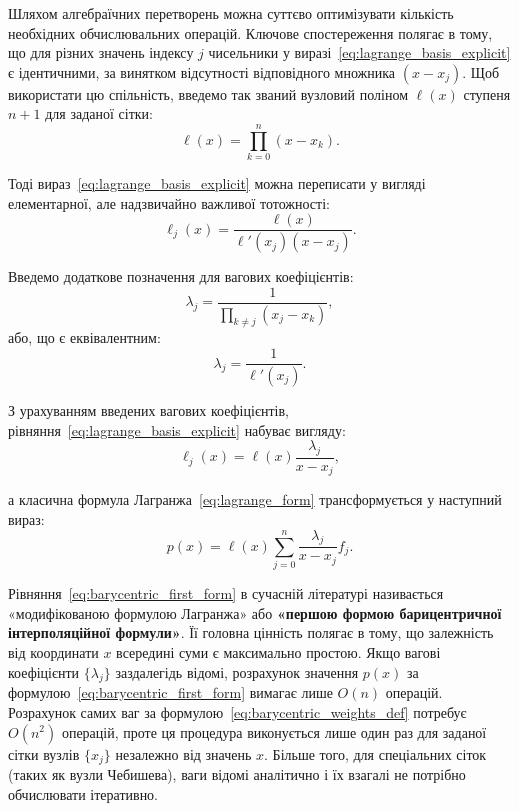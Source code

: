 Шляхом алгебраїчних перетворень можна суттєво оптимізувати кількість необхідних обчислювальних операцій. Ключове спостереження полягає в тому, що для різних значень індексу $j$ чисельники у виразі~\eqref{eq:lagrange_basis_explicit} є ідентичними, за винятком відсутності відповідного множника $(x - x_j)$. Щоб використати цю спільність, введемо так званий вузловий поліном $\ell(x)$ ступеня $n+1$ для заданої сітки:
\begin{equation}\label{eq:nodal_polynomial}
	\ell(x) = \prod_{k=0}^{n} (x - x_k).
\end{equation}

Тоді вираз~\eqref{eq:lagrange_basis_explicit} можна переписати у вигляді елементарної, але надзвичайно важливої тотожності:
\begin{equation}\label{eq:lagrange_identity}
	\ell_j(x) = \frac{\ell(x)}{\ell'(x_j)(x - x_j)}.
\end{equation}

Введемо додаткове позначення для вагових коефіцієнтів:
\begin{equation}\label{eq:barycentric_weights_def}
	\lambda_j = \frac{1}{\prod_{k \neq j} (x_j - x_k)},
\end{equation}
або, що є еквівалентним:
\begin{equation}\label{eq:barycentric_weights_derivative}
	\lambda_j = \frac{1}{\ell'(x_j)}.
\end{equation}

З урахуванням введених вагових коефіцієнтів, рівняння~\eqref{eq:lagrange_basis_explicit} набуває вигляду:
\begin{equation}\label{eq:lagrange_basis_barycentric}
	\ell_j(x) = \ell(x) \frac{\lambda_j}{x - x_j},
\end{equation}

а класична формула Лагранжа~\eqref{eq:lagrange_form} трансформується у наступний вираз:
\begin{equation}\label{eq:barycentric_first_form}
	p(x) = \ell(x) \sum_{j=0}^{n} \frac{\lambda_j}{x - x_j} f_j.
\end{equation}

Рівняння~\eqref{eq:barycentric_first_form} в сучасній літературі називається «модифікованою формулою Лагранжа» або \textbf{«першою формою барицентричної інтерполяційної формули»}. Її головна цінність полягає в тому, що залежність від координати $x$ всередині суми є максимально простою. Якщо вагові коефіцієнти $\{\lambda_j\}$ заздалегідь відомі, розрахунок значення $p(x)$ за формулою~\eqref{eq:barycentric_first_form} вимагає лише $O(n)$ операцій. Розрахунок самих ваг за формулою~\eqref{eq:barycentric_weights_def} потребує $O(n^2)$ операцій, проте ця процедура виконується лише один раз для заданої сітки вузлів $\{x_j\}$ незалежно від значень $x$. Більше того, для спеціальних сіток (таких як вузли Чебишева), ваги відомі аналітично і їх взагалі не потрібно обчислювати ітеративно.

